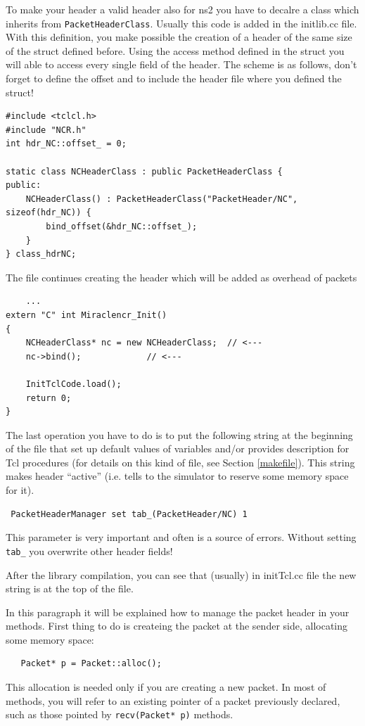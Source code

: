 \documentclass[a4paper,10pt]{article}
\begin{document}
To make your header a valid header also for ns2 you have to decalre a class which inherits from \verb=PacketHeaderClass=. Usually this code is added in the initlib.cc file. With this definition, you make possible the creation of a header of the same size of the struct defined before. Using the access method defined in the struct you will able to access every single field of the header. The scheme is as follows, don't forget to define the offset and to include the header file where you defined the struct!
\begin{verbatim}
#include <tclcl.h>
#include "NCR.h"
int hdr_NC::offset_ = 0;

static class NCHeaderClass : public PacketHeaderClass {
public:
	NCHeaderClass() : PacketHeaderClass("PacketHeader/NC", sizeof(hdr_NC)) {
	 	bind_offset(&hdr_NC::offset_);
	}
} class_hdrNC;
\end{verbatim}
The file continues creating the header which will be added as overhead of packets
\begin{verbatim}
	...
extern "C" int Miraclencr_Init()
{
	NCHeaderClass* nc = new NCHeaderClass;  // <---
	nc->bind();				// <---

	InitTclCode.load();
	return 0;
}
\end{verbatim}
The last operation you have to do is to put the following string at the beginning of the file that set up default values of variables and/or provides description for Tcl procedures (for details on this kind of file, see Section \ref{makefile}). This string makes header ``active'' (i.e. tells to the simulator to reserve some memory space for it).
\begin{verbatim}
 PacketHeaderManager set tab_(PacketHeader/NC) 1
\end{verbatim}
This parameter is very important and often is a source of errors. Without setting \verb=tab_= you overwrite other header fields!

After the library compilation, you can see that (usually) in initTcl.cc file the new string is at the top of the file.

In this paragraph it will be explained how to manage the packet header in your methods. First thing to do is createing the packet at the sender side, allocating some memory space:
\begin{verbatim}
   Packet* p = Packet::alloc();
\end{verbatim}
This allocation is needed only if you are creating a new packet. In most of methods, you will refer to an existing pointer of a packet previously declared, such as those pointed by \verb=recv(Packet* p)= methods.
\end{document}
